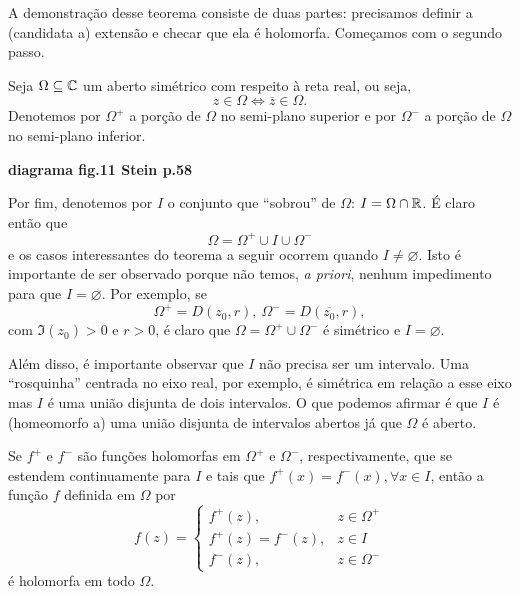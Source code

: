    A demonstração desse teorema consiste de duas partes: precisamos definir a 
    (candidata a) extensão e checar que ela é holomorfa. Começamos com o segundo passo.
    
    Seja $\Omega\subseteq\mathbb{C}$ um aberto simétrico com respeito à reta real, ou seja,
    \begin{equation*}
        z\in\Omega \iff \overline{z}\in\Omega.
    \end{equation*}
    Denotemos por 
    $\Omega^+$ a porção de $\Omega$ no semi-plano superior e por 
    $\Omega^-$ a porção de $\Omega$ no semi-plano inferior.
    \begin{center}
        \textbf{diagrama fig.11 Stein p.58}
    \end{center}
    Por fim, denotemos por $I$ o conjunto que ``sobrou'' de $\Omega$: 
    $I = \Omega\cap\mathbb{R}$. É claro então que
    \begin{equation*}
        \Omega = \Omega^+ \cup I \cup \Omega^-
    \end{equation*}
    e os casos interessantes do teorema a seguir ocorrem quando $I\neq\varnothing$.
    Isto é importante de ser observado porque não temos, {\it a priori}, nenhum
    impedimento para que $I = \varnothing$. Por exemplo, se
    \begin{equation*}
        \Omega^+ = D(z_0, r), \ \Omega^- = D(\overline{z_0},r),
    \end{equation*}
    com $\Im(z_0) > 0$ e $r > 0$, é claro que $\Omega = \Omega^+\cup\Omega^-$ é simétrico
    e $I = \varnothing$.
    
    Além disso, é importante observar que $I$ não precisa ser um intervalo. Uma
    ``rosquinha'' centrada no eixo real, por exemplo, é simétrica em relação a esse eixo
    mas $I$ é uma união disjunta de dois intervalos. O que podemos afirmar é que
    $I$ é (homeomorfo a) uma união disjunta de intervalos abertos já que $\Omega$ é aberto.
    
    \begin{teorema}
    \label{teo-principio-simetria}
        Se $f^+$ e $f^-$ são funções holomorfas em $\Omega^+$ e $\Omega^-$, respectivamente,
        que se estendem continuamente para $I$ e tais que $f^+(x) = f^-(x), \forall x\in I$,
        então a função $f$ definida em $\Omega$ por
        \begin{equation*}
            f(z) =  \begin{cases}
                      f^+(z),          & z\in\Omega^+ \\
                      f^+(z) = f^-(z), & z\in I       \\
                      f^-(z),          & z\in\Omega^-
                    \end{cases}
        \end{equation*}
        é holomorfa em todo $\Omega$.
    \end{teorema}
    
